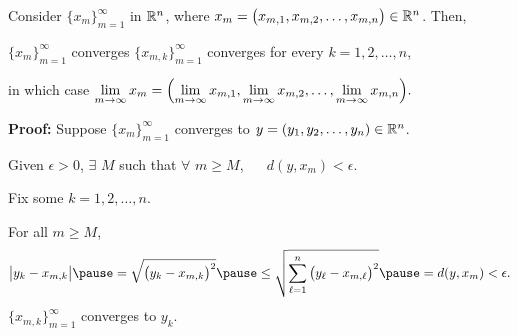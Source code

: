\documentclass[10pt,aspectratio=149]{beamer}
\begin{document}
%
%
%
%

\begin{frame}

\begin{proposition}
Consider $\{ x_m \}_{m=1}^\infty$ in ${\mathbb{R}}^n$,
where $x_m = \bigl(x_{m,1},x_{m,2},\ldots,x_{m,n}\bigr) \in {\mathbb{R}}^n$.
\pause
Then,

 $\{ x_m \}_{m=1}^\infty$ converges \wiffif
$\{ x_{m,k} \}_{m=1}^\infty$ converges for every $k=1,2,\ldots,n$,

\medskip
\pause
in which case
\qquad
$\displaystyle
\lim_{m\to\infty}
x_m =
\Bigl(
\lim_{m\to\infty} x_{m,1},
\lim_{m\to\infty} x_{m,2},
\ldots,
\lim_{m\to\infty} x_{m,n}
\Bigr) .
$
\end{proposition}

\pause

\textbf{Proof:}
Suppose
$\{ x_m \}_{m=1}^\infty$ converges to
$y = (y_1,y_2,\ldots,y_n) \in {\mathbb{R}}^n$.

\pause
\medskip

Given $\epsilon > 0$, $\exists$ $M$ such that $\forall$ $m \geq M$, ~~
$d(y,x_m) < \epsilon$.

\pause
\medskip

Fix some $k=1,2,\ldots,n$.

\pause
For all $m \geq M$,
\begin{equation*}
\bigl\lvert y_k - x_{m,k} \bigr\rvert
\pause
=
\sqrt{{\bigl(y_k - x_{m,k} \bigr)}^2}
\pause
\leq
\sqrt{\sum_{\ell=1}^n {\bigl(y_\ell-x_{m,\ell}\bigr)}^2}
\pause
= d(y,x_m) < \epsilon .
\end{equation*}
\pause
\thus \quad $\{ x_{m,k} \}_{m=1}^\infty$ converges to $y_k$.

\end{frame}
\end{document}
